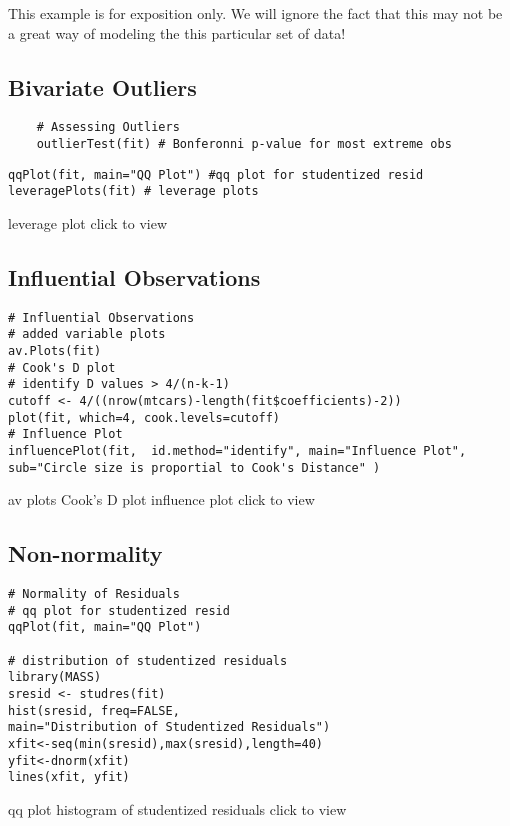 \documentclass{article}
\begin{document}
This example is for exposition only. We will ignore the fact that this may not be a great way of modeling the this particular set of data!

\subsection{Bivariate Outliers}

\begin{framed}
	\begin{verbatim}
	# Assessing Outliers
	outlierTest(fit) # Bonferonni p-value for most extreme obs

	\end{verbatim}
\end{framed}
\begin{framed}
	\begin{verbatim}
qqPlot(fit, main="QQ Plot") #qq plot for studentized resid 
leveragePlots(fit) # leverage plots
	\end{verbatim}
\end{framed}
leverage plot click to view

\subsection{Influential Observations}

\begin{framed}
\begin{verbatim}
# Influential Observations
# added variable plots 
av.Plots(fit)
# Cook's D plot
# identify D values > 4/(n-k-1) 
cutoff <- 4/((nrow(mtcars)-length(fit$coefficients)-2)) 
plot(fit, which=4, cook.levels=cutoff)
# Influence Plot 
influencePlot(fit,	id.method="identify", main="Influence Plot", sub="Circle size is proportial to Cook's Distance" )
\end{verbatim}
\end{framed}
av plots Cook's D plot influence plot click to view
\subsection{Non-normality}
\begin{framed}
\begin{verbatim}
# Normality of Residuals
# qq plot for studentized resid
qqPlot(fit, main="QQ Plot")

# distribution of studentized residuals
library(MASS)
sresid <- studres(fit) 
hist(sresid, freq=FALSE, 
main="Distribution of Studentized Residuals")
xfit<-seq(min(sresid),max(sresid),length=40) 
yfit<-dnorm(xfit) 
lines(xfit, yfit)
\end{verbatim}
\end{framed}
qq plot histogram of studentized residuals click to view
\end{document}
